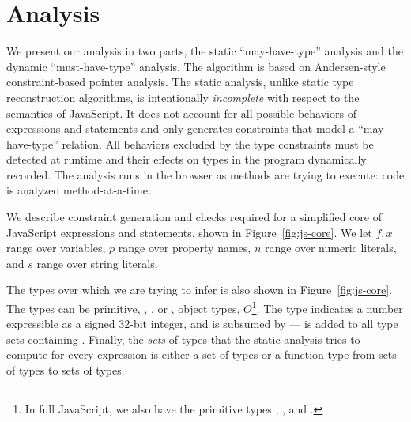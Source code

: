 \section{Analysis}

We present our analysis in two parts, the static ``may-have-type'' analysis
and the dynamic ``must-have-type'' analysis. The algorithm is based on
Andersen-style constraint-based pointer analysis. The static analysis, unlike
static type reconstruction algorithms, is intentionally \textit{incomplete}
with respect to the semantics of JavaScript. It does not account for all
possible behaviors of expressions and statements and only generates
constraints that model a ``may-have-type'' relation. All behaviors excluded by
the type constraints must be detected at runtime and their effects on types in
the program dynamically recorded. The analysis runs in the browser as methods
are trying to execute: code is analyzed method-at-a-time.

%
%
%
%
%
%

We describe constraint generation and checks required for a simplified core of
JavaScript expressions and statements, shown in Figure~\ref{fig:js-core}. We
let $f,x$ range over variables, $p$ range over property names, $n$ range over
numeric literals, and $s$ range over string literals.

The types over which we are trying to infer is also shown in
Figure~\ref{fig:js-core}. The types can be primitive, ,
, or , object types, $O$\footnote{In full
  JavaScript, we also have the primitive types , , and
  .}. The  type indicates a number expressible as a
signed 32-bit integer, and is subsumed by  ---  is
added to all type sets containing . Finally, the \emph{sets} of
types that the static analysis tries to compute for every expression is either
a set of types or a function type from sets of types to sets of types.

